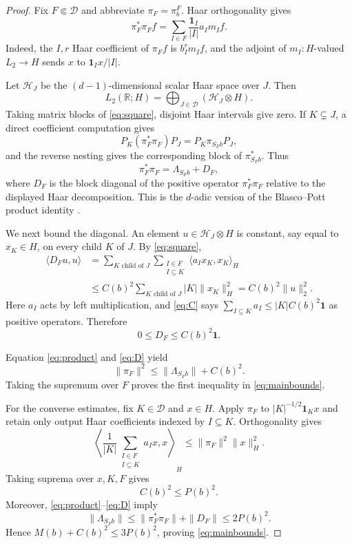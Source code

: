\documentclass[11pt]{article}
\newcommand{\D}{\mathcal D}
\newcommand{\one}{\mathbf 1}
\begin{document}
\begin{proof}
Fix $F\Subset\D$ and abbreviate $\pi_F=\pi_b^F$.  Haar orthogonality gives
\begin{equation}\label{eq:square}
 \pi_F^*\pi_F f
 =\sum_{I\in F}\frac{\one_I}{|I|}a_I m_If.
\end{equation}
Indeed, the $I,r$ Haar coefficient of $\pi_Ff$ is $b_I^rm_If$, and the
adjoint of $m_I:H$-valued $L_2\to H$ sends $x$ to $\one_Ix/|I|$.

Let $\mathcal H_J$ be the $(d-1)$-dimensional scalar Haar space over $J$.
Then
\[
 L_2(\mathbb R;H)
 =\bigoplus_{J\in\D}(\mathcal H_J\otimes H).
\]
Taking matrix blocks of \eqref{eq:square}, disjoint Haar intervals give zero.
If $K\subsetneq J$, a direct coefficient computation gives
\[
 P_K(\pi_F^*\pi_F)P_J=P_K\pi_{S_Fb}P_J,
\]
and the reverse nesting gives the corresponding block of
$\pi_{S_Fb}^*$.  Thus
\begin{equation}\label{eq:product}
 \pi_F^*\pi_F=\Lambda_{S_Fb}+D_F,
\end{equation}
where $D_F$ is the block diagonal of the positive operator
$\pi_F^*\pi_F$ relative to the displayed Haar decomposition.  This is the
$d$-adic version of the Blasco--Pott product identity
\cite[Lemma~2.3]{BlascoPott}.

We next bound the diagonal.  An element $u\in\mathcal H_J\otimes H$ is
constant, say equal to $x_K\in H$, on every child $K$ of $J$.  By
\eqref{eq:square},
\begin{align*}
 \langle D_Fu,u\rangle
 &=\sum_{K\text{ child of }J}
   \sum_{\substack{I\in F\\I\subseteq K}}
   \langle a_Ix_K,x_K\rangle_H\\
 &\le C(b)^2\sum_{K\text{ child of }J}|K|\|x_K\|_H^2
 =C(b)^2\|u\|_2^2.
\end{align*}
Here $a_I$ acts by left multiplication, and \eqref{eq:C} says
$\sum_{I\subseteq K}a_I\le |K|C(b)^2\one$ as positive operators.
Therefore
\begin{equation}\label{eq:D}
 0\le D_F\le C(b)^2\one.
\end{equation}

Equation \eqref{eq:product} and \eqref{eq:D} yield
\begin{equation}\label{eq:upperone}
 \|\pi_F\|^2\le\|\Lambda_{S_Fb}\|+C(b)^2.
\end{equation}
Taking the supremum over $F$ proves the first inequality in
\eqref{eq:mainbounds}.

For the converse estimates, fix $K\in\D$ and $x\in H$.  Apply $\pi_F$ to
$|K|^{-1/2}\one_Kx$ and retain only output Haar coefficients indexed by
$I\subseteq K$.  Orthogonality gives
\[
 \left\langle
   \frac1{|K|}\sum_{\substack{I\in F\\I\subseteq K}}a_Ix,x
 \right\rangle_H
 \le\|\pi_F\|^2\|x\|_H^2.
\]
Taking suprema over $x,K,F$ gives
\begin{equation}\label{eq:bmolower}
 C(b)^2\le P(b)^2.
\end{equation}
Moreover, \eqref{eq:product}--\eqref{eq:D} imply
\[
 \|\Lambda_{S_Fb}\|
 \le\|\pi_F^*\pi_F\|+\|D_F\|
 \le2P(b)^2.
\]
Hence $M(b)+C(b)^2\le3P(b)^2$, proving \eqref{eq:mainbounds}.


\end{proof}
\end{document}
